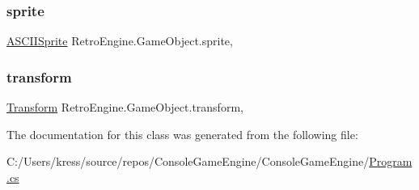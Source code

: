 \mbox{\label{class_retro_engine_1_1_game_object_ac8f322b9fa5abb6664116b0c4cacf277}} 
\subsubsection{\texorpdfstring{sprite}{sprite}}
{\footnotesize\ttfamily \mbox{\hyperlink{class_retro_engine_1_1_a_s_c_i_i_sprite}{A\+S\+C\+I\+I\+Sprite}} Retro\+Engine.\+Game\+Object.\+sprite\hspace{0.3cm}{\ttfamily [get]}, {\ttfamily [set]}}

\mbox{\label{class_retro_engine_1_1_game_object_a74571987066a58b56e5f17f57da239e7}} 
\subsubsection{\texorpdfstring{transform}{transform}}
{\footnotesize\ttfamily \mbox{\hyperlink{class_retro_engine_1_1_transform}{Transform}} Retro\+Engine.\+Game\+Object.\+transform\hspace{0.3cm}{\ttfamily [get]}, {\ttfamily [set]}}



The documentation for this class was generated from the following file\+:\begin{DoxyCompactItemize}
\item 
C\+:/\+Users/kress/source/repos/\+Console\+Game\+Engine/\+Console\+Game\+Engine/\mbox{\hyperlink{_program_8cs}{Program.\+cs}}\end{DoxyCompactItemize}
